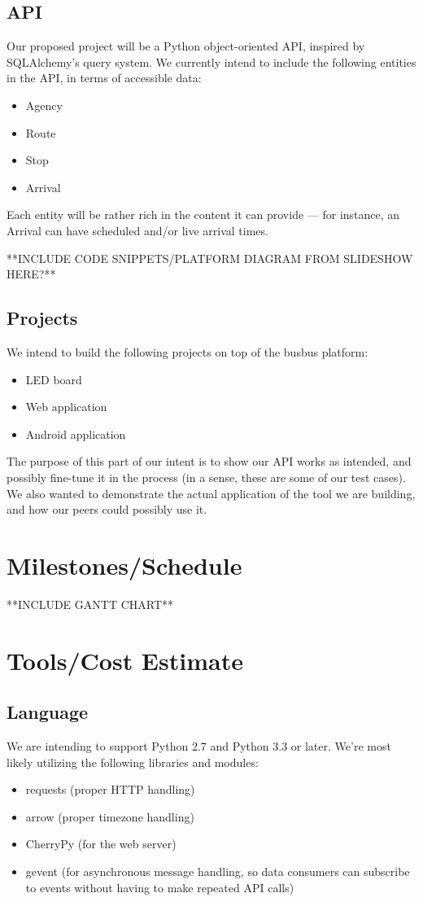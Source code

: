 \documentclass[12pt]{article}
\begin{document}
\subsection{API}
Our proposed project will be a Python object-oriented API, inspired by SQLAlchemy's query system.
We currently intend to include the following entities in the API, in terms of accessible data:
\begin{itemize}
\item Agency
\item Route
\item Stop
\item Arrival
\end{itemize}
Each entity will be rather rich in the content it can provide --- for instance, an Arrival can have scheduled
and/or live arrival times.

**INCLUDE CODE SNIPPETS/PLATFORM DIAGRAM FROM SLIDESHOW HERE?**

\subsection{Projects}
We intend to build the following projects on top of the busbus platform:
\begin{itemize}
\item LED board
\item Web application
\item Android application
\end{itemize}
The purpose of this part of our intent is to show our API works as intended, and possibly
fine-tune it in the process (in a sense, these are some of our test cases). We also wanted 
to demonstrate the actual application of the tool we are building, and how our peers
could possibly use it.

\section{Milestones/Schedule}
**INCLUDE GANTT CHART**

\section{Tools/Cost Estimate}
\subsection{Language}
We are intending to support Python 2.7 and Python 3.3 or later. We're most likely utilizing the following
libraries and modules:
\begin{itemize}
\item requests (proper HTTP handling)
\item arrow (proper timezone handling)
\item CherryPy (for the web server)
\item gevent (for asynchronous message handling, so data consumers can subscribe to events
without having to make repeated API calls)
\end{itemize}
\end{document}

